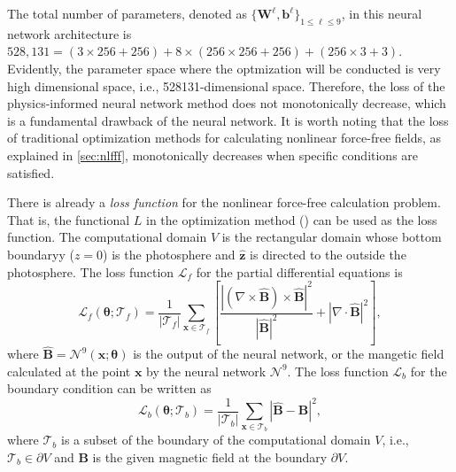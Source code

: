 The total number of parameters, denoted as $\{\boldsymbol{W}^{\ell}, \mathbf{b}^{\ell}\}_{1 \le \ell \le 9}$, in this neural network architecture is $528,131=(3\times256 + 256) + 8\times(256\times256 + 256) + (256\times3 + 3)$. Evidently, the parameter space where the optmization will be conducted is very high dimensional space, i.e., 528131-dimensional space. Therefore, the loss of the physics-informed neural network method does not monotonically decrease, which is a fundamental drawback of the neural network. It is worth noting that the loss of traditional optimization methods for calculating nonlinear force-free fields, as explained in \cref{sec:nlfff}, monotonically decreases when specific conditions are satisfied.

There is already a \emph{loss function} for the nonlinear force-free calculation problem. That is, the functional $L$ in the optimization method () can be used as the loss function. The computational domain $V$ is the rectangular domain whose bottom boundaryy ($z=0$) is the photosphere and $\mathbf{\hat{z}}$ is directed to the outside the photosphere. The loss function $\mathcal{L}_f$ for the partial differential equations is
\begin{equation*}
    \mathcal{L}_f(\boldsymbol{\theta}; \mathcal{T}_f) = \frac{1}{|\mathcal{T}_f|} \sum_{\boldsymbol{x}\in \mathcal{T}_f} \left[\frac{|(\nabla \times \mathbf{\hat{B}})\times \mathbf{\hat{B}}|^2}{|\mathbf{\hat{B}}|^2} + |\nabla \cdot \mathbf{\hat{B}}|^2 \right],
\end{equation*}
where $\mathbf{\hat{B}}=\mathcal{N}^9(\boldsymbol{x}; \boldsymbol{\theta})$ is the output of the neural network, or the mangetic field calculated at the point $\boldsymbol{x}$ by the neural network $\mathcal{N}^9$. The loss function $\mathcal{L}_b$ for the boundary condition can be written as 
\begin{equation*}
    \mathcal{L}_b(\boldsymbol{\theta};\mathcal{T}_b)=\frac{1}{|\mathcal{T}_b|}\sum_{\boldsymbol{x}\in\mathcal{T}_b}{|\mathbf{\hat{B}}-\mathbf{B}|^2},
\end{equation*}
where $\mathcal{T}_b$ is a subset of the boundary of the computational domain $V$, i.e., $\mathcal{T}_b \in \partial V$ and $\mathbf{B}$ is the given magnetic field at the boundary $\partial V$.

